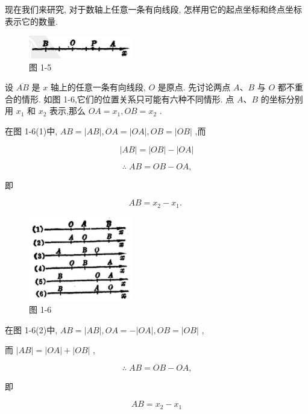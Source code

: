 \documentclass[lang=cn,newtx,10pt,scheme=chinese]{elegantbook}
\begin{document}
现在我们来研究, 对于数轴上任意一条有向线段, 怎样用它的起点坐标和终点坐标表示它的数量.

\begin{figure}[h]
  \centering
  \includegraphics[max width=0.4\textwidth]{images/01912cc2-ffb6-728e-9ae7-b113ff05c64b_8_647013.jpg}
  \caption{图 1-5}
\end{figure}


设 \(\overline{AB}\) 是 \(x\) 轴上的任意一条有向线段, \(O\) 是原点. 先讨论两点 \(A\text{、}B\) 与 \(O\) 都不重合的情形. 如图 1-6,它们的位置关系只可能有六种不同情形. 点 \(A\text{、}B\) 的坐标分别用 \({x}_{1}\) 和 \({x}_{2}\) 表示,那么 \({OA} = {x}_{1},{OB} = {x}_{2}\) .

在图 1-6(1)中, \({AB} = \left| {AB}\right| ,{OA} = \left| {OA}\right| ,{OB} = \left| {OB}\right|\) ,而

\[
  \left| {AB}\right| = \left| {OB}\right| - \left| {OA}\right|
\]

\[
  \therefore \;{AB} = {OB} - {OA}\text{,}
\]

即

\[
    {AB} = {x}_{2} - {x}_{1}\text{. }
\]

\begin{figure}[h]
  \centering
  \includegraphics[max width=0.4\textwidth]{images/01912cc2-ffb6-728e-9ae7-b113ff05c64b_9_561693.jpg}
  \caption{图 1-6}
\end{figure}



在图 1-6(2)中, \({AB} = \left| {AB}\right| ,{OA} = - \left| {OA}\right| ,{OB} = \left| {OB}\right|\) ,

而 \(\left| {AB}\right| = \left| {OA}\right| + \left| {OB}\right|\) ,

\[
  \therefore \;{AB} = {OB} - {OA}\text{,}
\]

即

\[
    {AB} = {x}_{2} - {x}_{1}
\]
\end{document}
